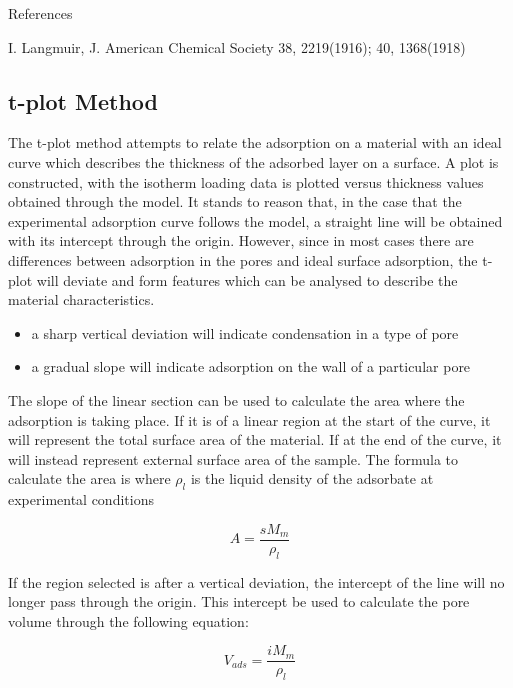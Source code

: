 References

I. Langmuir, J. American Chemical Society 38, 2219(1916); 40, 1368(1918)

\subsection{t-plot Method}

The t-plot method attempts to relate the adsorption on a material
with an ideal curve which describes the thickness of the adsorbed
layer on a surface. A plot is constructed, with the isotherm loading
data is plotted versus thickness values obtained through the model.
It stands to reason that, in the case that the experimental adsorption
curve follows the model, a straight line will be obtained with its
intercept through the origin. However, since in most cases there
are differences between adsorption in the pores and ideal surface
adsorption, the t-plot will deviate and form features which can
be analysed to describe the material characteristics.

\begin{itemize}

	\item a sharp vertical deviation will indicate condensation
	      in a type of pore
	\item a gradual slope will indicate adsorption on the
	      wall of a particular pore

\end{itemize}

The slope of the linear section can be used to calculate the area where
the adsorption is taking place. If it is of a linear region at the start
of the curve, it will represent the total surface area of the material.
If at the end of the curve, it will instead represent external surface
area of the sample. The formula to calculate the area is
where \(\rho_{l}\) is the liquid density of the adsorbate at experimental
conditions

\begin{equation}
	A = \frac{s M_m}{\rho_{l}}
\end{equation}


If the region selected is after a vertical deviation, the intercept of the line
will no longer pass through the origin. This intercept be used to calculate the
pore volume through the following equation:

\begin{equation}
	V_{ads} = \frac{i M_m}{\rho_{l}}
\end{equation}


